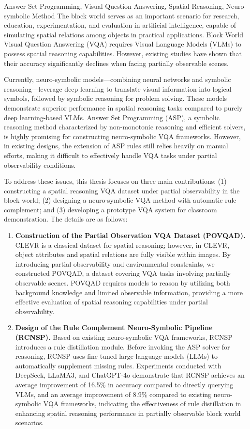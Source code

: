 \begin{englishabstract}{Answer Set Programming, Visual Question Answering, Spatial Reasoning, Neuro-symbolic Method}
The block world serves as an important scenario for research, education, experimentation, and evaluation in artificial intelligence, capable of simulating spatial relations among objects in practical applications. Block World Visual Question Answering (VQA) requires Visual Language Models (VLMs) to possess spatial reasoning capabilities. However, existing studies have shown that their accuracy significantly declines when facing partially observable scenes. 

Currently, neuro-symbolic models—combining neural networks and symbolic reasoning—leverage deep learning to translate visual information into logical symbols, followed by symbolic reasoning for problem solving. These models demonstrate superior performance in spatial reasoning tasks compared to purely deep learning-based VLMs. Answer Set Programming (ASP), a symbolic reasoning method characterized by non-monotonic reasoning and efficient solvers, is highly promising for constructing neuro-symbolic VQA frameworks. However, in existing designs, the extension of ASP rules still relies heavily on manual efforts, making it difficult to effectively handle VQA tasks under partial observability conditions.

To address these issues, this thesis focuses on three main contributions: (1) constructing a spatial reasoning VQA dataset under partial observability in the block world; (2) designing a neuro-symbolic VQA method with automatic rule complement; and (3) developing a prototype VQA system for classroom demonstration. The details are as follows:

\begin{enumerate}[itemsep=0pt]
\item \textbf{Construction of the Partial Observation VQA Dataset (POVQAD).} CLEVR is a classical dataset for spatial reasoning; however, in CLEVR, object attributes and spatial relations are fully visible within images. By introducing partial observability and environmental constraints, we constructed POVQAD, a dataset covering VQA tasks involving partially observable scenes. POVQAD requires models to reason by utilizing both background knowledge and limited observable information, providing a more effective evaluation of spatial reasoning capabilities under partial observability.

\item \textbf{Design of the Rule Complement Neuro-Symbolic Pipeline (RCNSP).} Based on existing neuro-symbolic VQA frameworks, RCNSP introduces a rule distillation module. Before invoking the ASP solver for reasoning, RCNSP uses fine-tuned large language models (LLMs) to automatically supplement missing rules. Experiments conducted with DeepSeek, LLaMA3, and ChatGPT-4o demonstrate that RCNSP achieves an average improvement of 16.5\% in accuracy compared to directly querying VLMs, and an average improvement of 8.9\% compared to existing neuro-symbolic VQA frameworks, indicating the effectiveness of rule distillation in enhancing spatial reasoning performance in partially observable block world scenarios.


\end{enumerate}
\end{englishabstract}
